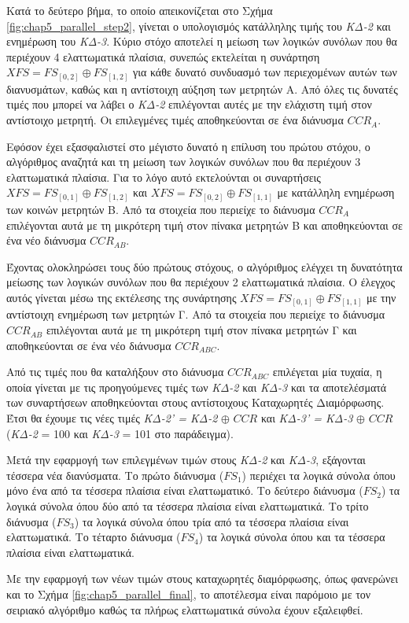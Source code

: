 Κατά το δεύτερο βήμα, το οποίο απεικονίζεται στο Σχήμα \ref{fig:chap5_parallel_step2}, γίνεται ο υπολογισμός κατάλληλης τιμής του \textit{ΚΔ-2} και ενημέρωση του \textit{ΚΔ-3}. Κύριο στόχο αποτελεί η μείωση των λογικών συνόλων που θα περιέχουν 4 ελαττωματικά πλαίσια, συνεπώς εκτελείται η συνάρτηση $XFS = FS_{[0,2]} \oplus FS_{[1,2]}$ για κάθε δυνατό συνδυασμό των περιεχομένων αυτών των διανυσμάτων, καθώς και η αντίστοιχη αύξηση των μετρητών Α. Από όλες τις δυνατές τιμές που μπορεί να λάβει ο \textit{ΚΔ-2} επιλέγονται αυτές με την ελάχιστη τιμή στον αντίστοιχο μετρητή. Οι επιλεγμένες τιμές αποθηκεύονται σε ένα διάνυσμα $CCR_{A}$.
\par
Εφόσον έχει εξασφαλιστεί στο μέγιστο δυνατό η επίλυση του πρώτου στόχου, ο αλγόριθμος αναζητά και τη μείωση των λογικών συνόλων που θα περιέχουν 3 ελαττωματικά πλαίσια. Για το λόγο αυτό εκτελούνται οι συναρτήσεις $XFS = FS_{[0,1]} \oplus FS_{[1,2]}$ και $XFS = FS_{[0,2]} \oplus FS_{[1,1]}$ με κατάλληλη ενημέρωση των κοινών μετρητών Β. Από τα στοιχεία που περιείχε το διάνυσμα $CCR_{A}$ επιλέγονται αυτά με τη μικρότερη τιμή στον πίνακα μετρητών Β και αποθηκεύονται σε ένα νέο διάνυσμα $CCR_{AB}$.
\par
Έχοντας ολοκληρώσει τους δύο πρώτους στόχους, ο αλγόριθμος ελέγχει τη δυνατότητα μείωσης των λογικών συνόλων που θα περιέχουν 2 ελαττωματικά πλαίσια. Ο έλεγχος αυτός γίνεται μέσω της εκτέλεσης της συνάρτησης $XFS = FS_{[0,1]} \oplus FS_{[1,1]}$ με την αντίστοιχη ενημέρωση των μετρητών Γ. Από τα στοιχεία που περιείχε το διάνυσμα $CCR_{AB}$ επιλέγονται αυτά με τη μικρότερη τιμή στον πίνακα μετρητών Γ και αποθηκεύονται σε ένα νέο διάνυσμα $CCR_{ABC}$.
\par
Από τις τιμές που θα καταλήξουν στο διάνυσμα $CCR_{ABC}$ επιλέγεται μία τυχαία, η οποία γίνεται \xor με τις προηγούμενες τιμές των \textit{ΚΔ-2} και \textit{ΚΔ-3} και τα αποτελέσματά των συναρτήσεων αποθηκεύονται στους αντίστοιχους Καταχωρητές Διαμόρφωσης. Έτσι θα έχουμε τις νέες τιμές \textit{ΚΔ-2’ = ΚΔ-2} $\oplus$ $CCR$ και \textit{ΚΔ-3’ = ΚΔ-3} $\oplus$ $CCR$ (\textit{ΚΔ-2} = 100 και \textit{ΚΔ-3} = 101 στο παράδειγμα).
\par
Μετά την εφαρμογή των επιλεγμένων τιμών στους \textit{ΚΔ-2} και \textit{ΚΔ-3}, εξάγονται τέσσερα νέα διανύσματα. Το πρώτο διάνυσμα ($FS_{1}$) περιέχει τα λογικά σύνολα όπου μόνο ένα από τα τέσσερα πλαίσια είναι ελαττωματικό. Το δεύτερο διάνυσμα ($FS_{2}$) τα λογικά σύνολα όπου δύο από τα τέσσερα πλαίσια είναι ελαττωματικά. Το τρίτο διάνυσμα ($FS_{3}$) τα λογικά σύνολα όπου τρία από τα τέσσερα πλαίσια είναι ελαττωματικά. Το τέταρτο διάνυσμα ($FS_{4}$) τα λογικά σύνολα όπου και τα τέσσερα πλαίσια είναι ελαττωματικά.
\par
Με την εφαρμογή των νέων τιμών στους καταχωρητές διαμόρφωσης, όπως φανερώνει και το Σχήμα \ref{fig:chap5_parallel_final}, το αποτέλεσμα είναι παρόμοιο με τον σειριακό αλγόριθμο καθώς τα πλήρως ελαττωματικά σύνολα έχουν εξαλειφθεί.

